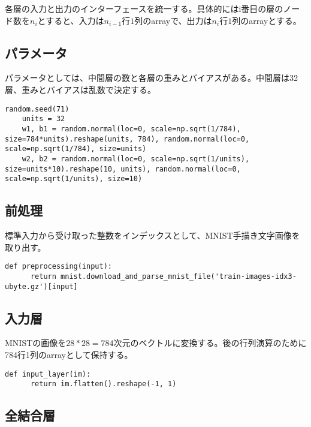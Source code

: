 \documentclass[platex,dvipdfmx]{jsarticle}
\begin{document}
  各層の入力と出力のインターフェースを統一する。具体的にはi番目の層のノード数を$n_i$とすると、入力は$n_{i-1}$行$1$列のarrayで、出力は$n_i$行$1$列のarrayとする。

  \subsection{パラメータ}

  パラメータとしては、中間層の数と各層の重みとバイアスがある。中間層は32層、重みとバイアスは乱数で決定する。

  \begin{lstlisting}[caption=ex1.py, label=paramater]
    random.seed(71)
    units = 32
    w1, b1 = random.normal(loc=0, scale=np.sqrt(1/784), size=784*units).reshape(units, 784), random.normal(loc=0, scale=np.sqrt(1/784), size=units)
    w2, b2 = random.normal(loc=0, scale=np.sqrt(1/units), size=units*10).reshape(10, units), random.normal(loc=0, scale=np.sqrt(1/units), size=10)
  \end{lstlisting}

  \subsection{前処理}

  標準入力から受け取った整数をインデックスとして、MNIST手描き文字画像を取り出す。

  \begin{lstlisting}[caption=ex1.py, label=preprocessing]
    def preprocessing(input):
      return mnist.download_and_parse_mnist_file('train-images-idx3-ubyte.gz')[input]
  \end{lstlisting}

  \subsection{入力層}

  MNISTの画像を$28*28=784$次元のベクトルに変換する。後の行列演算のために784行1列のarrayとして保持する。

  \begin{lstlisting}[caption=ex1.py, label=input_layer]
    def input_layer(im):
      return im.flatten().reshape(-1, 1)
  \end{lstlisting}

  \subsection{全結合層}
\end{document}
